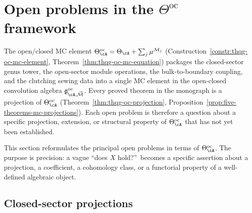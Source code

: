 \section{Open problems in the \texorpdfstring{$\Theta^{\mathrm{oc}}$}{Theta-oc} framework}
\label{sec:concordance-open-problems-theta-oc}

The open/closed MC element
$\Theta^{\mathrm{oc}}_\cA = \Theta_\cA + \sum_j \mu^{\mathcal{M}_j}$
(Construction~\ref{constr:thqg-oc-mc-element},
Theorem~\ref{thm:thqg-oc-mc-equation})
packages the closed-sector genus tower, the open-sector module
operations, the bulk-to-boundary coupling, and the clutching
sewing data into a single MC element in the open-closed
convolution algebra
$\mathfrak{g}^{\mathrm{oc}}_{\cA, \vec{\mathcal{M}}}$.
Every proved theorem in the monograph is a projection of
$\Theta^{\mathrm{oc}}_\cA$
(Theorem~\ref{thm:thqg-oc-projection},
Proposition~\ref{prop:five-theorems-mc-projections}).
Each open problem is therefore a question about a specific
projection, extension, or structural property of
$\Theta^{\mathrm{oc}}_\cA$ that has not yet been established.

This section reformulates the principal open problems
in terms of $\Theta^{\mathrm{oc}}_\cA$. The purpose
is precision: a vague ``does $X$ hold?''\ becomes a
specific assertion about a projection, a coefficient,
a cohomology class, or a functorial property of a
well-defined algebraic object.

\subsection{Closed-sector projections}

